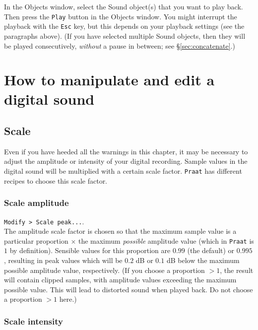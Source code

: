 \documentclass[
]{book}
\begin{document}
\label{box-praatplay}
In the Objects window, select the Sound object(s) that you want to play back. Then press the \texttt{Play} button in the Objects window. You might interrupt the playback with the \texttt{Esc} key, but this depends on your playback settings (see the paragraphs above). (If you have selected multiple Sound objects, then they will be played consecutively, \emph{without} a pause in between; see §\ref{sec:concatenate}.)

\section{How to manipulate and edit a digital sound}\label{how-to-manipulate-and-edit-a-digital-sound}

\subsection{Scale}\label{scale}

Even if you have heeded all the warnings in this chapter, it may be necessary to adjust the amplitude or intensity of your digital recording. Sample values in the digital sound will be multiplied with a certain scale factor. \texttt{Praat} has different recipes to choose this scale factor.

\label{box-praatscale}
\subsubsection{Scale amplitude}\label{scale-amplitude}

\texttt{Modify\ \textgreater{}\ Scale\ peak...}.\\
The amplitude scale factor is chosen so that the maximum sample value is a particular proportion \(\times\) the maximum \emph{possible} amplitude value (which in \texttt{Praat} is \(1\) by definition). Sensible values for this proportion are \(0.99\) (the default) or \(0.995\), resulting in peak values which will be \(0.2\) dB or \(0.1\) dB below the maximum possible amplitude value, respectively. (If you choose a proportion \(>1\), the result will contain clipped samples, with amplitude values exceeding the maximum possible value. This will lead to distorted sound when played back. Do not choose a proportion \(>1\) here.)

\subsubsection{Scale intensity}\label{scale-intensity}
\end{document}
